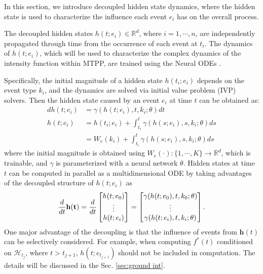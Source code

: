 In this section, we introduce decoupled hidden state dynamics, 
where the hidden state is used to characterize the influence each event $e_i$ has on the overall process.

The decoupled hidden states $h(t; e_i) \in \mathbb{R}^d$, where $i=1, \cdots, n$,
are independently propagated through time from the occurrence of each event at $t_i$.  
The dynamics of $h(t; e_i)$, which will be used to characterize the complex dynamics of the intensity function within MTPP, are trained using the Neural ODEs \cite{bib:node}. 

Specifically, the initial magnitude of a hidden state $h(t_i;e_i)$ depends on the event type $k_i$, 
and the 
dynamics are solved via initial value problem (IVP) solvers. 
Then the hidden state caused by an event $e_i$ at time $t$ can be obtained as: 
\begin{align}
d h(t;e_i) &=  \gamma(h(t;e_i), t, k_i;\theta) dt \\
h(t;e_i) &= h(t_i;e_i) + \int ^t _{t_i} \gamma(h(s;e_i), s, k_i;\theta) ds \nonumber\\
& = W_{e}(k_i) + \int ^t _{t_i} \gamma(h(s;e_i), s, k_i;\theta) ds 
\label{eq:hiddenS}
\end{align}
where the initial magnitude is obtained using $W_{e}(\cdot): \{1, \cdots, K\} \rightarrow \mathbb{R}^{d}$, which is trainable, and $\gamma$ is parameterized with a neural network $\theta$. Hidden states at time $t$ can be computed in parallel as a multidimensional ODE by 
taking advantages of the decoupled structure of $h(t;e_i)$ as 
\begin{align}
    {d \over dt} \mathbf{h(t)} = 
    {d \over dt}
    \begin{bmatrix}
        h(t;e_0) \\
        \vdots \\ h(t;e_i)
    \end{bmatrix}
    = 
    \begin{bmatrix}
        \gamma(h(t;e_0), t, k_0;\theta) \\ \vdots \\ \gamma(h(t;e_i), t, k_i; \theta)
    \end{bmatrix}. 
    \label{eq: hidden parallel}
\end{align}
One major advantage of the decoupling is that the influence of events from $\mathbf{h}(t)$ can be selectively considered. 
For example, when computing $f^*(t)$ 
conditioned on $\mathcal{H}_{t_j}$, where $t > t_{j+1}$, $h(t;e_{t_{j+1}})$ should not be included in computation. The details will be discussed in the Sec. \ref{sec:ground int}.

